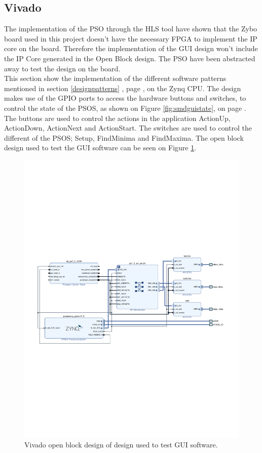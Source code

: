 \clearpage

\subsection{Vivado}
The implementation of the PSO through the HLS tool have shown that the Zybo board used in this project doesn't have the necessary FPGA to implement the IP core on the board. Therefore the implementation of the GUI design won't include the IP Core generated in the Open Block design. The PSO have been abstracted away to test the design on the board.\\

This section show the implementation of the different software patterns mentioned in section \ref{designpatterns} , page \pageref{designpatterns}, on the Zynq CPU. The design makes use of the GPIO ports to access the hardware buttons and switches, to control the state of the PSOS, as shown on Figure \ref{fig:smdguistate}, on page \pageref{fig:smdguistate}. The buttons are used to control the actions in the application ActionUp, ActionDown, ActionNext and ActionStart. The switches are used to control the different of the PSOS; Setup, FindMinima and FindMaxima. The open block design used to test the GUI software can be seen on Figure \ref{fig:vivadoblockdesign}.


\begin{figure}[H]
	\centering
	\includegraphics[trim={0 260 0 260},clip,width=1\linewidth]{diagram/VivadoBlockDesign}
	\caption{Vivado open block design of design used to test GUI software.}
	\label{fig:vivadoblockdesign}
\end{figure}

